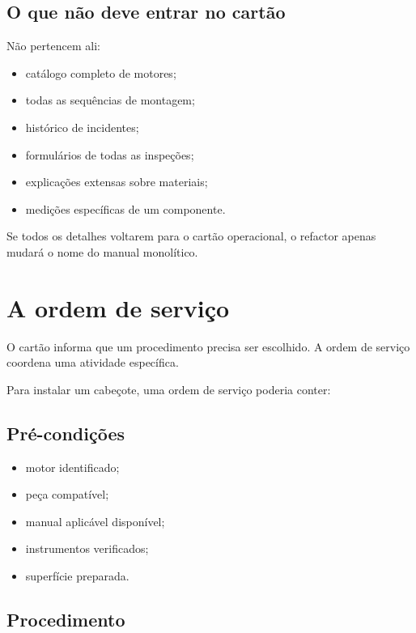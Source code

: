 \documentclass[
  10pt,
  a4paper,
  oneside]{book}
\providecommand{\tightlist}{%
  \setlength{\itemsep}{0pt}\setlength{\parskip}{0pt}}
\begin{document}
\hypertarget{o-que-nuxe3o-deve-entrar-no-cartuxe3o}{%
\subsection{O que não deve entrar no
cartão}\label{o-que-nuxe3o-deve-entrar-no-cartuxe3o}}

Não pertencem ali:

\begin{itemize}
\tightlist
\item
  catálogo completo de motores;
\item
  todas as sequências de montagem;
\item
  histórico de incidentes;
\item
  formulários de todas as inspeções;
\item
  explicações extensas sobre materiais;
\item
  medições específicas de um componente.
\end{itemize}

Se todos os detalhes voltarem para o cartão operacional, o refactor
apenas mudará o nome do manual monolítico.

\hypertarget{a-ordem-de-serviuxe7o}{%
\section{A ordem de serviço}\label{a-ordem-de-serviuxe7o}}

O cartão informa que um procedimento precisa ser escolhido. A ordem de
serviço coordena uma atividade específica.

Para instalar um cabeçote, uma ordem de serviço poderia conter:

\hypertarget{pruxe9-condiuxe7uxf5es}{%
\subsection{Pré-condições}\label{pruxe9-condiuxe7uxf5es}}

\begin{itemize}
\tightlist
\item
  motor identificado;
\item
  peça compatível;
\item
  manual aplicável disponível;
\item
  instrumentos verificados;
\item
  superfície preparada.
\end{itemize}

\hypertarget{procedimento}{%
\subsection{Procedimento}\label{procedimento}}
\end{document}
